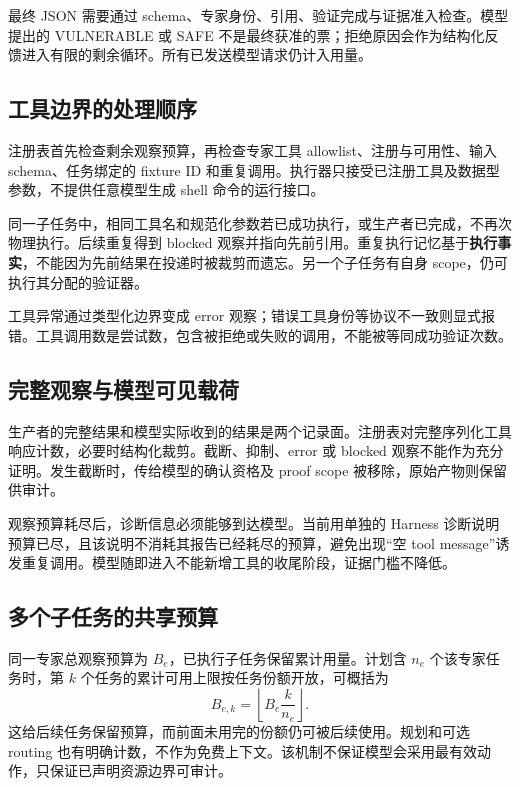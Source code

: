 最终 JSON 需要通过 schema、专家身份、引用、验证完成与证据准入检查。模型提出的 VULNERABLE 或 SAFE 不是最终获准的票；拒绝原因会作为结构化反馈进入有限的剩余循环。所有已发送模型请求仍计入用量。

\subsection{工具边界的处理顺序}
注册表首先检查剩余观察预算，再检查专家工具 allowlist、注册与可用性、输入 schema、任务绑定的 fixture ID 和重复调用。执行器只接受已注册工具及数据型参数，不提供任意模型生成 shell 命令的运行接口。

同一子任务中，相同工具名和规范化参数若已成功执行，或生产者已完成，不再次物理执行。后续重复得到 blocked 观察并指向先前引用。重复执行记忆基于\textbf{执行事实}，不能因为先前结果在投递时被裁剪而遗忘。另一个子任务有自身 scope，仍可执行其分配的验证器。

工具异常通过类型化边界变成 error 观察；错误工具身份等协议不一致则显式报错。工具调用数是尝试数，包含被拒绝或失败的调用，不能被等同成功验证次数。

\subsection{完整观察与模型可见载荷}
生产者的完整结果和模型实际收到的结果是两个记录面。注册表对完整序列化工具响应计数，必要时结构化裁剪。截断、抑制、error 或 blocked 观察不能作为充分证明。发生截断时，传给模型的确认资格及 proof scope 被移除，原始产物则保留供审计。

观察预算耗尽后，诊断信息必须能够到达模型。当前用单独的 Harness 诊断说明预算已尽，且该说明不消耗其报告已经耗尽的预算，避免出现“空 tool message”诱发重复调用。模型随即进入不能新增工具的收尾阶段，证据门槛不降低。

\subsection{多个子任务的共享预算}
同一专家总观察预算为 $B_e$，已执行子任务保留累计用量。计划含 $n_e$ 个该专家任务时，第 $k$ 个任务的累计可用上限按任务份额开放，可概括为
\begin{equation}
 B_{e,k}=\left\lfloor B_e\frac{k}{n_e}\right\rfloor.
\end{equation}
这给后续任务保留预算，而前面未用完的份额仍可被后续使用。规划和可选 routing 也有明确计数，不作为免费上下文。该机制不保证模型会采用最有效动作，只保证已声明资源边界可审计。


